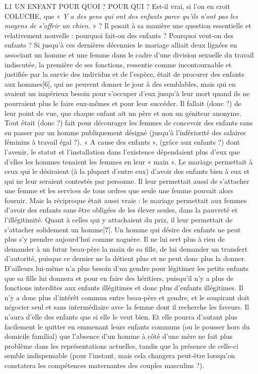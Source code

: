 L1 UN ENFANT POUR QUOI ? POUR QUI ?
 Est-il vrai, si l'on en croit COLUCHE, que « \emph{Y a des gens qui ont des enfants parce qu'ils n'ont pas les moyens de s'offrir un chien.} » ? Il posait à sa manière une question essentielle et relativement nouvelle : pourquoi fait-on des enfants ? Pourquoi veut-on des enfants ?
 Si jusqu'à ces dernières décennies le mariage alliait deux lignées en associant un homme et une femme dans le cadre d'une division sexuelle du travail indiscutée, la première de ses fonctions, ressentie comme incontournable et justifiée par la survie des individus et de l'espèce, était de procurer des enfants aux hommes[6], qui ne peuvent donner le jour à des semblables, mais qui en avaient un impérieux besoin pour s'occuper d'eux jusqu'à leur mort quand ils ne pourraient plus le faire eux-mêmes et pour leur succéder. Il fallait (donc ?) de leur point de vue, que chaque enfant ait un père et non un géniteur anonyme. 
 Tout était (donc ?) fait pour décourager les femmes de concevoir des enfants sans en passer par un homme publiquement désigné (jusqu'à l'infériorité des salaires féminins à travail égal ?). « A cause des enfants », (grâce aux enfants ?) dont l'avenir, le statut et l'installation dans l'existence dépendaient plus d'eux que d'elles les hommes tenaient les femmes en leur « main ». Le mariage permettait à ceux qui le désiraient (à la plupart d'entre eux) d'avoir des enfants bien à eux et qui ne leur seraient contestés par personne. Il leur permettait aussi de s'attacher une femme et les services de tous ordres que seule une femme pouvait alors fournir. Mais la réciproque était aussi vraie : le mariage permettait aux femmes d'avoir des enfants sans être obligées de les élever seules, dans la pauvreté et l'illégitimité. Quant à celles qui y attachaient du prix, il leur permettait de s'attacher solidement un homme[7]. 
 Un homme qui désire des enfants ne peut plus s'y prendre aujourd'hui comme naguère. Il ne lui sert plus à rien de demander à un futur beau-père la main de sa fille, de lui demander un transfert d'autorité, puisque ce dernier ne la détient plus et ne peut donc plus la donner. D'ailleurs lui-même n'a plus besoin d'un gendre pour légitimer les petits enfants que sa fille lui donnera et pour en faire des héritiers, puisqu'il n'y a plus de fonctions interdites aux enfants illégitimes et donc plus d'enfants illégitimes. Il n'y a donc plus d'intérêt commun entre beau-père et gendre, et le soupirant doit négocier seul et sans intermédiaire avec la femme dont il recherche les faveurs. Il n'aura d'elle des enfants que si elle le veut bien. Et elle pourra d'autant plus facilement le quitter en emmenant leurs enfants communs (ou le pousser hors du domicile familial) que l'absence d'un homme à côté d'une mère ne fait plus problème dans les représentations actuelles, tandis que la présence de celle-ci semble indispensable (pour l'instant, mais cela changera peut-être lorsqu'on constatera les compétences maternantes des couples masculins ?). 
